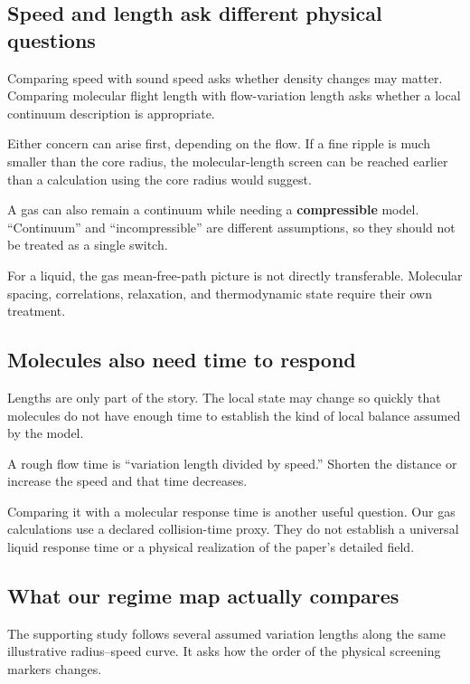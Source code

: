\documentclass[
  english,
  11pt,
]{article}
\begin{document}
\subsection{Speed and length ask different physical
questions}\label{speed-and-length-ask-different-physical-questions}

Comparing speed with sound speed asks whether density changes may
matter. Comparing molecular flight length with flow-variation length
asks whether a local continuum description is appropriate.

Either concern can arise first, depending on the flow. If a fine ripple
is much smaller than the core radius, the molecular-length screen can be
reached earlier than a calculation using the core radius would suggest.

A gas can also remain a continuum while needing a \textbf{compressible}
model. ``Continuum'' and ``incompressible'' are different assumptions,
so they should not be treated as a single switch.

For a liquid, the gas mean-free-path picture is not directly
transferable. Molecular spacing, correlations, relaxation, and
thermodynamic state require their own treatment.

\subsection{Molecules also need time to
respond}\label{molecules-also-need-time-to-respond}

Lengths are only part of the story. The local state may change so
quickly that molecules do not have enough time to establish the kind of
local balance assumed by the model.

A rough flow time is ``variation length divided by speed.'' Shorten the
distance or increase the speed and that time decreases.

Comparing it with a molecular response time is another useful question.
Our gas calculations use a declared collision-time proxy. They do not
establish a universal liquid response time or a physical realization of
the paper's detailed field.

\subsection{What our regime map actually
compares}\label{what-our-regime-map-actually-compares}

The supporting study follows several assumed variation lengths along the
same illustrative radius--speed curve. It asks how the order of the
physical screening markers changes.
\end{document}
